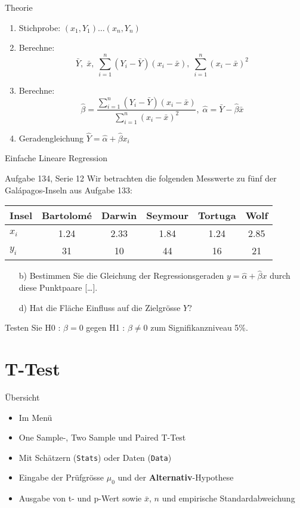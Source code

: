 \documentclass[handout]{beamer}
\newlength{\tikey}
\newcommand{\keystroke}[1]{\settowidth{\tikey}{\scriptsize #1}\psframebox[framearc=0.2]{\parbox{\tikey}{\scriptsize #1}}}
\begin{document}
\begin{frame}{Theorie}
\begin{enumerate}
\item Stichprobe: $(x_1,Y_1)\ldots(x_n, Y_n)$
\item Berechne:
$$
\bar{Y},\; \bar{x},\; \sum_{i=1}^n (Y_i-\bar{Y})(x_i-\bar{x}),\; \sum_{i=1}^n(x_i-\bar{x})^2
$$

\item Berechne:
$$
\hat{\beta} = \frac{\sum_{i=1}^n (Y_i-\bar{Y})(x_i-\bar{x})}{\sum_{i=1}^n(x_i-\bar{x})^2},\;
\hat{\alpha} = \bar{Y}-\hat{\beta}\bar{x}
$$

\item Geradengleichung $\hat{Y}=\hat{\alpha}+\hat{\beta}x_i$
\end{enumerate}
\end{frame}

\begin{frame}{Einfache Lineare Regression}
\begin{beamerboxesrounded}[shadow]{Aufgabe 134, Serie 12}
Wir betrachten die folgenden Messwerte zu fünf der Galápagos-Inseln aus Aufgabe
133:

\vspace{2mm}\begin{center}{\scriptsize\begin{tabular}{l|ccccc}\toprule
Insel & Bartolomé & Darwin & Seymour & Tortuga & Wolf\\\midrule
$x_i$&
1.24&2.33&1.84&1.24&2.85\\
$y_i$&
31&10&44&16&21\\
\bottomrule
\end{tabular}}\end{center}\vspace{2mm}

\begin{itemize}
\item[b)] Bestimmen Sie die Gleichung der Regressionsgeraden
$y=\hat{\alpha}+\hat{\beta}x$ durch diese Punktpaare [\dots].
\item[d)] Hat die Fläche Einfluss auf die Zielgrösse $Y$?
\end{itemize}
Testen Sie H0 : $\beta = 0$ gegen H1 : $\beta \ne 0$
zum Signifikanzniveau 5\%.
\end{beamerboxesrounded}
\end{frame}

\section{T-Test}
\begin{frame}{Übersicht}
\begin{itemize}
\item Im Menü \keystroke{F6}
\item One Sample-, Two Sample und Paired T-Test
\item Mit Schätzern (\texttt{Stats}) oder Daten (\texttt{Data})
\item Eingabe der Prüfgrösse $\mu_0$ und der \textbf{Alternativ}-Hypothese
\item Ausgabe von t- und p-Wert sowie $\bar{x}$, $n$ und empirische Standardabweichung
\end{itemize}
\end{frame}
\end{document}
